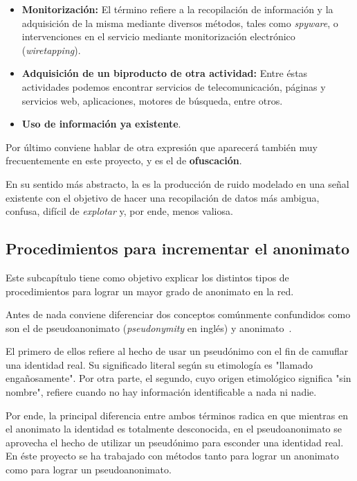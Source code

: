 \begin{itemize}
	\item {\textbf{Monitorización:} El término refiere a la recopilación de información y la adquisición de la misma mediante diversos métodos, tales como \textit{spyware}, o intervenciones en el servicio mediante monitorización electrónico (\textit{wiretapping}).}
	\item {\textbf{Adquisición de un biproducto de otra actividad:} Entre éstas actividades podemos encontrar servicios de telecomunicación, páginas y servicios web, aplicaciones, motores de búsqueda, entre otros.} 
	\item {\textbf{Uso de información ya existente}.}
\end{itemize} 

Por último conviene hablar de otra expresión que aparecerá también muy frecuentemente en este proyecto, y es el de \textbf{ofuscación}.

En su sentido más abstracto, la  es la producción de ruido modelado en una señal existente con el objetivo de hacer una recopilación de datos más ambigua, confusa, difícil de \textit{explotar} y, por ende, menos valiosa.

\subsection{Procedimientos para incrementar el anonimato}

Este subcapítulo tiene como objetivo explicar los distintos tipos de procedimientos para lograr un mayor grado de anonimato en la red. 

Antes de nada conviene diferenciar dos conceptos comúnmente confundidos como son el de pseudoanonimato (\textit{pseudonymity} en inglés) y anonimato~\cite{article:anopseudo}.

El primero de ellos refiere al hecho de usar un pseudónimo con el fin de camuflar una identidad real. Su significado literal según su etimología es  "llamado engañosamente".
Por otra parte, el segundo, cuyo origen etimológico significa "sin nombre", refiere cuando no hay información identificable a nada ni nadie.

Por ende, la principal diferencia entre ambos términos radica en que mientras en el anonimato la identidad es totalmente desconocida, en el pseudoanonimato se aprovecha el hecho de utilizar un pseudónimo para esconder una identidad real. 
En éste proyecto se ha trabajado con métodos tanto para lograr un anonimato como para lograr un pseudoanonimato.

